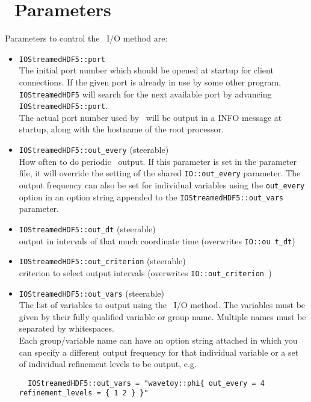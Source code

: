 \documentclass{article}
\begin{document}
\section{\ThisThorn\ Parameters}

Parameters to control the \ThisThorn\ I/O method are:
\begin{itemize}
  \item {\tt IOStreamedHDF5::port}\\
        The initial port number which should be opened at startup for
        client connections. If the given port is already in use by some other
        program, {\tt IOStreamedHDF5} will search for the next available port
        by advancing {\tt IOStreamedHDF5::port}.\\
        The actual port number used by \ThisThorn\ will be output in a INFO
        message at startup, along with the hostname of the root processor.

  \item {\tt IOStreamedHDF5::out\_every} (steerable)\\
        How often to do periodic \ThisThorn\ output. If this parameter
        is set in the parameter file, it will override the setting of the shared
        {\tt IO::out\_every} parameter. The output frequency can also be set
        for individual variables using the {\tt out\_every} option in an option
        string appended to the {\tt IOStreamedHDF5::out\_vars} parameter.

  \item {\tt IOStreamedHDF5::out\_dt} (steerable)\\
        output in intervals of that much coordinate time (overwrites {\tt IO::ou
t\_dt})

  \item {\tt IOStreamedHDF5::out\_criterion} (steerable)\\
        criterion to select output intervals (overwrites {\tt IO::out\_criterion
})

  \item {\tt IOStreamedHDF5::out\_vars} (steerable)\\
        The list of variables to output using the \ThisThorn\ I/O method.
        The variables must be given by their fully qualified variable or group
        name. Multiple names must be separated by whitespaces.\\

        Each group/variable name can have an option string attached in which you
        can specify a different output frequency for that individual variable
        or a set of individual refinement levels to be output, e.g.
\begin{verbatim}
  IOStreamedHDF5::out_vars = "wavetoy::phi{ out_every = 4 refinement_levels = { 1 2 } }"
\end{verbatim}


\end{itemize}
\end{document}
